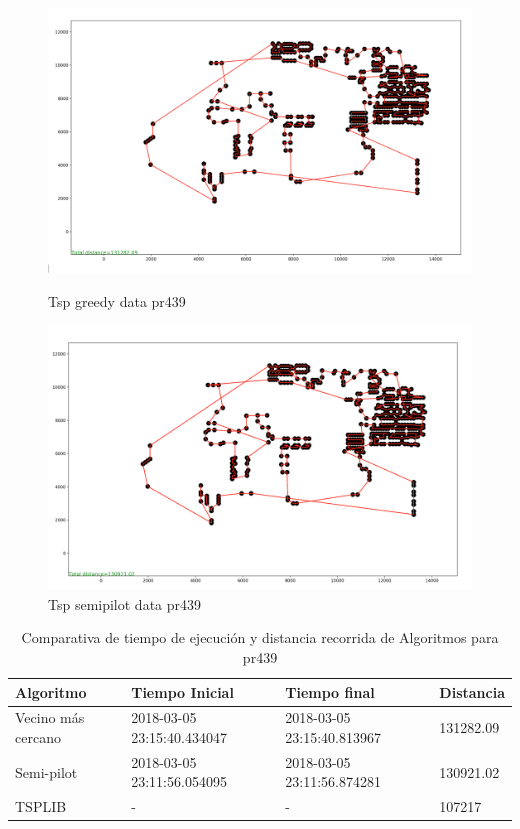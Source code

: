 \documentclass{article}
\begin{document}
	\begin{figure}[H]
		\begin{minipage}{0.5\textwidth}
			\centering
			\includegraphics[width=1\textwidth]{../../image/greedy/greedy-pr439.png}
			\caption{\label{fig:Figura1} Tsp greedy data pr439}
		\end{minipage}\hfill
		\begin {minipage}{0.5\textwidth}
		\centering
		\includegraphics[width=1\textwidth]{../../image/semipilot/semipilot-pr439-2-2.png}
		\caption{\label{fig:Figura1} Tsp semipilot data pr439}
	\end{minipage}
\end{figure}

\begin{table}[H]
	\centering
	\caption{Comparativa de tiempo de ejecución y distancia recorrida de Algoritmos para pr439}
	\label{Table:pr439}
	\begin{tabular}{| l | l | l | l |}
		\hline
		Algoritmo & Tiempo Inicial & Tiempo final & Distancia \\ \hline
		Vecino más cercano & 2018-03-05 23:15:40.434047 & 2018-03-05 23:15:40.813967 & 131282.09 \\ \hline
		Semi-pilot & 2018-03-05 23:11:56.054095 & 2018-03-05 23:11:56.874281 & 130921.02 \\ \hline
		TSPLIB & - & - & 107217 \\ \hline
		
	\end{tabular}
\end{table}
\end{document}
